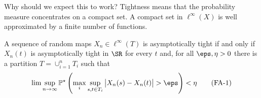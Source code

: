 \begin{remark*}[Intuition]
	Why should we expect this to work?	Tightness means that the probability measure concentrates on a compact set. A compact set in \(\ell^\infty(X)\) is well approximated by a finite number of functions. 
\end{remark*}
\begin{theorem}
	\label{thm:vdv1.5.6}
	A sequence of random maps \(X_n \in \ell^\infty(T)\) is asymptotically tight if and only if \(X_n(t)\) is asymptotically tight in  \(\SR\) for every  \(t\) and, for all  \(\eps,\eta > 0\) there is a partition  \(T = \cup_{i=1}^n T_i\) such that 
	 \begin{equation}
		\label{eq:fa-1}
		\lim\sup_{n\to\infty}\P^\star\left(\max_i \sup_{s,t\in T_i} \left|X_n(s) -X_n(t)\right|>\eps\right)<\eta\tag{FA-1}
	\end{equation}
\end{theorem}
